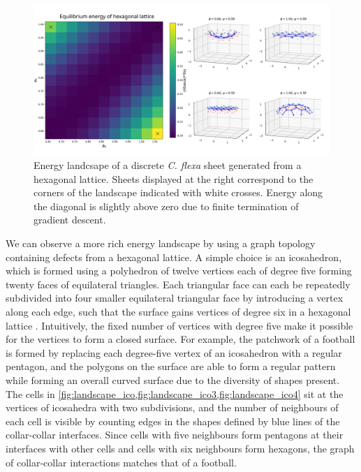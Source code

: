 \begin{figure}
	\centering
	\includegraphics[width=\textwidth]{landscape_hex.png}
	\caption[Energy landscape of a discrete \textit{C. flexa} sheet generated from a hexagonal lattice]{Energy landcsape of a discrete \textit{C. flexa} sheet generated from a hexagonal lattice. Sheets displayed at the right correspond to the corners of the landscape indicated with white crosses. Energy along the diagonal is slightly above zero due to finite termination of gradient descent.}
	\label{fig:landscape_flat}
\end{figure}

We can observe a more rich energy landscape by using a graph topology containing defects from a hexagonal lattice.
A simple choice is an icosahedron, which is formed using a polyhedron of twelve vertices each of degree five forming twenty faces of equilateral triangles.
Each triangular face can each be repeatedly subdivided into four smaller equilateral triangular face by introducing a vertex along each edge, such that the surface gains vertices of degree six in a hexagonal lattice \citep{dahl2014}.
Intuitively, the fixed number of vertices with degree five make it possible for the vertices to form a closed surface.
For example, the patchwork of a football is formed by replacing each degree-five vertex of an icosahedron with a regular pentagon, and the polygons on the surface are able to form a regular pattern while forming an overall curved surface due to the diversity of shapes present.
The cells in \cref{fig:landscape_ico,fig:landscape_ico3,fig:landscape_ico4} sit at the vertices of icosahedra with two subdivisions, and the number of neighbours of each cell is visible by counting edges in the shapes defined by blue lines of the collar-collar interfaces.
Since cells with five neighbours form pentagons at their interfaces with other cells and cells with six neighbours form hexagons, the graph of collar-collar interactions matches that of a football.


